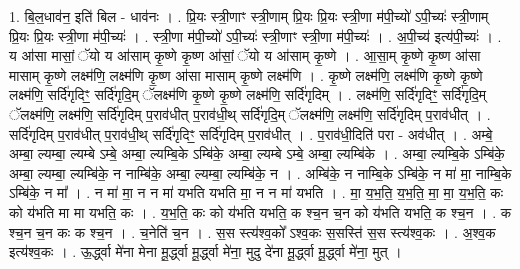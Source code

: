 \documentclass[17pt]{extarticle}
\begin{document}
1. बि॒ल॒धाव॑न॒ इति॑ बिल - धाव॑नः । . प्रि॒यः स्त्री॒णाꣳ स्त्री॒णाम् प्रि॒यः प्रि॒यः स्त्री॒णा म॑पी॒च्यो॑ ऽपी॒च्यः॑ स्त्री॒णाम् प्रि॒यः प्रि॒यः स्त्री॒णा म॑पी॒च्यः॑ । . स्त्री॒णा म॑पी॒च्यो॑ ऽपी॒च्यः॑ स्त्री॒णाꣳ स्त्री॒णा म॑पी॒च्यः॑ । . अ॒पी॒च्य॑ इत्य॑पी॒च्यः॑ । . य आ॑सा मासां॒ ॅयो य आ॑साम् कृ॒ष्णे कृ॒ष्ण आ॑सां॒ ॅयो य आ॑साम् कृ॒ष्णे । . आ॒सा॒म् कृ॒ष्णे कृ॒ष्ण आ॑सा मासाम् कृ॒ष्णे लक्ष्म॑णि॒ लक्ष्म॑णि कृ॒ष्ण आ॑सा मासाम् कृ॒ष्णे लक्ष्म॑णि । . कृ॒ष्णे लक्ष्म॑णि॒ लक्ष्म॑णि कृ॒ष्णे कृ॒ष्णे लक्ष्म॑णि॒ सर्दि॑गृदिꣳ॒॒ सर्दि॑गृदि॒म् ॅलक्ष्म॑णि कृ॒ष्णे कृ॒ष्णे लक्ष्म॑णि॒ सर्दि॑गृदिम् । . लक्ष्म॑णि॒ सर्दि॑गृदिꣳ॒॒ सर्दि॑गृदि॒म् ॅलक्ष्म॑णि॒ लक्ष्म॑णि॒ सर्दि॑गृदिम् प॒राव॑धीत् प॒राव॑धी॒थ् सर्दि॑गृदि॒म् ॅलक्ष्म॑णि॒ लक्ष्म॑णि॒ सर्दि॑गृदिम् प॒राव॑धीत् । . सर्दि॑गृदिम् प॒राव॑धीत् प॒राव॑धी॒थ् सर्दि॑गृदिꣳ॒॒ सर्दि॑गृदिम् प॒राव॑धीत् । . प॒राव॑धी॒दिति॑ परा - अव॑धीत् । . अम्बे॒ अम्बा॒ ल्यम्बा॒ ल्यम्बे ऽम्बे॒ अम्बा॒ ल्यम्बि॒के ऽम्बि॑के॒ अम्बा॒ ल्यम्बे ऽम्बे॒ अम्बा॒ ल्यम्बि॑के । . अम्बा॒ ल्यम्बि॒के ऽम्बि॑के॒ अम्बा॒ ल्यम्बा॒ ल्यम्बि॑के॒ न नाम्बि॑के॒ अम्बा॒ ल्यम्बा॒ ल्यम्बि॑के॒ न । . अम्बि॑के॒ न नाम्बि॒के ऽम्बि॑के॒ न मा॑ मा॒ नाम्बि॒के ऽम्बि॑के॒ न मा᳚ । . न मा॑ मा॒ न न मा॑ यभति यभति मा॒ न न मा॑ यभति । . मा॒ य॒भ॒ति॒ य॒भ॒ति॒ मा॒ मा॒ य॒भ॒ति॒ कः को य॑भति मा मा यभति॒ कः । . य॒भ॒ति॒ कः को य॑भति यभति॒ क श्च॒न च॒न को य॑भति यभति॒ क श्च॒न । . क श्च॒न च॒न कः क श्च॒न । . च॒नेति॑ च॒न । . स॒स स्त्य॑श्व॒को᳚ ऽश्व॒कः स॒सस्ति॑ स॒स स्त्य॑श्व॒कः । . अ॒श्व॒क इत्य॑श्व॒कः । . ऊ॒र्द्ध्वा मे॑ना मेना मू॒र्द्ध्वा मू॒र्द्ध्वा मे॑ना॒ मुदु दे॑ना मू॒र्द्ध्वा मू॒र्द्ध्वा मे॑ना॒ मुत् । \newline
\end{document}
